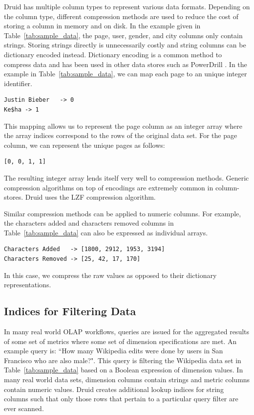 \documentclass{sig-alternate-2013}
\begin{document}
Druid has multiple column types to represent various data formats. Depending on
the column type, different compression methods are used to reduce the cost of
storing a column in memory and on disk. In the example given in
Table~\ref{tab:sample_data}, the page, user, gender, and city columns only
contain strings. Storing strings directly is unnecessarily costly and string
columns can be dictionary encoded instead. Dictionary encoding is a common
method to compress data and has been used in other data stores such as
PowerDrill \cite{hall2012processing}. In the example in
Table~\ref{tab:sample_data}, we can map each page to an unique integer
identifier.
{\small\begin{verbatim}
Justin Bieber   -> 0
Ke$ha -> 1
\end{verbatim}}
This mapping allows us to represent the page column as an integer
array where the array indices correspond to the rows of the original
data set. For the page column, we can represent the unique
pages as follows:
{\small\begin{verbatim}
[0, 0, 1, 1]
\end{verbatim}}

The resulting integer array lends itself very well to
compression methods. Generic compression algorithms on top of encodings are
extremely common in column-stores. Druid uses the LZF \cite{liblzf2013} compression
algorithm.

Similar compression methods can be applied to numeric
columns. For example, the characters added and characters removed columns in
Table~\ref{tab:sample_data} can also be expressed as individual
arrays.
{\small\begin{verbatim}
Characters Added   -> [1800, 2912, 1953, 3194]
Characters Removed -> [25, 42, 17, 170]
\end{verbatim}}
In this case, we compress the raw values as opposed to their dictionary
representations.

\subsection{Indices for Filtering Data}
In many real world OLAP workflows, queries are issued for the aggregated
results of some set of metrics where some set of dimension specifications are
met. An example query is: ``How many Wikipedia edits were done by users in
San Francisco who are also male?". This query is filtering the Wikipedia data
set in Table~\ref{tab:sample_data} based on a Boolean expression of dimension
values. In many real world data sets, dimension columns contain strings and
metric columns contain numeric values. Druid creates additional lookup
indices for string columns such that only those rows that pertain to a
particular query filter are ever scanned.
\end{document}
